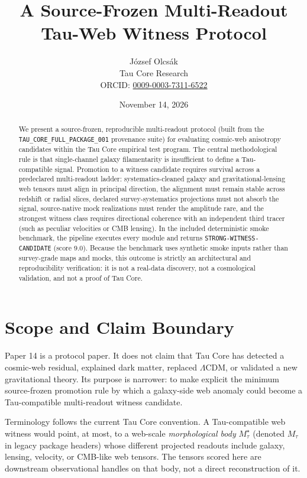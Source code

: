 \documentclass[11pt]{article}
\title{A Source-Frozen Multi-Readout Tau-Web Witness Protocol}
\author{J\'ozsef Olcs\'ak\\
\small Tau Core Research\\{\small ORCID: \href{https://orcid.org/0009-0003-7311-6522}{0009-0003-7311-6522}}}
\date{November 14, 2026}
\begin{document}
\maketitle

\begin{abstract}
We present a source-frozen, reproducible multi-readout protocol (built from the
\texttt{TAU\_CORE\_FULL\_PACKAGE\_001} provenance suite) for evaluating
cosmic-web anisotropy candidates within the Tau Core empirical test program.
The central methodological rule is that single-channel galaxy filamentarity is
insufficient to define a Tau-compatible signal. Promotion to a witness
candidate requires survival across a predeclared multi-readout ladder:
systematics-cleaned galaxy and gravitational-lensing web tensors must align in
principal direction, the alignment must remain stable across redshift or radial
slices, declared survey-systematics projections must not absorb the signal,
source-native mock realizations must render the amplitude rare, and the
strongest witness class requires directional coherence with an independent third
tracer (such as peculiar velocities or CMB lensing). In the included
deterministic smoke benchmark, the pipeline executes every module and returns
\texttt{STRONG-WITNESS-CANDIDATE} (score $9.0$). Because the benchmark uses
synthetic smoke inputs rather than survey-grade maps and mocks, this outcome is
strictly an architectural and reproducibility verification: it is not a
real-data discovery, not a cosmological validation, and not a proof of Tau Core.
\end{abstract}

\section{Scope and Claim Boundary}

Paper 14 is a protocol paper.  It does not claim that Tau Core has detected a
cosmic-web residual, explained dark matter, replaced $\Lambda$CDM, or validated
a new gravitational theory.  Its purpose is narrower: to make explicit the
minimum source-frozen promotion rule by which a galaxy-side web anomaly could
become a Tau-compatible multi-readout witness candidate.

Terminology follows the current Tau Core convention.  A Tau-compatible web
witness would point, at most, to a web-scale \emph{morphological body}
\(M_\tau^\star\) (denoted \(M_\tau\) in legacy package headers) whose different
projected readouts include galaxy, lensing, velocity, or CMB-like web tensors.
The tensors scored here are downstream observational handles on that body, not
a direct reconstruction of it.
\end{document}
